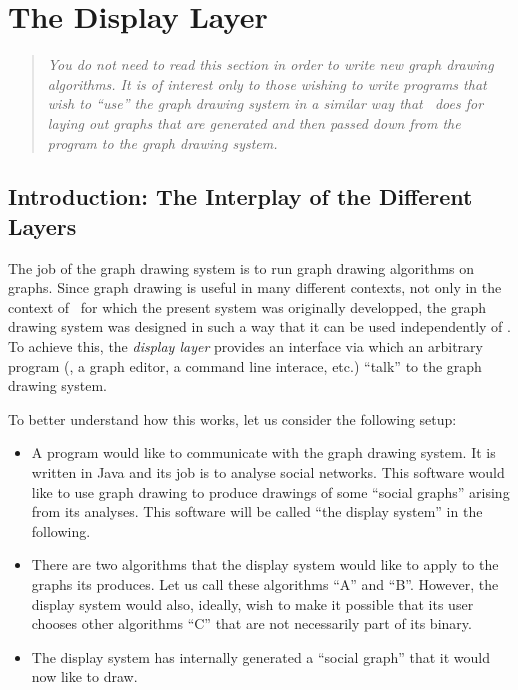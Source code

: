 %
%
%


\section{The Display Layer}

{}


\label{section-gd-display-layer}

\begin{quote}
  \itshape You do not need to read this section in order to write new
  graph drawing algorithms. It is of interest only to those wishing to
  write programs that wish to ``use'' the graph drawing system in a
  similar way that \tikzname\ does for laying out graphs that are
  generated and then passed down from the program to the graph drawing
  system.
\end{quote}


\subsection{Introduction: The Interplay of the Different Layers}

The job of the graph drawing system is to run graph drawing algorithms
on graphs. Since graph drawing is useful in many different contexts,
not only in the context of \tikzname\ for which the present system was
originally developped, the graph drawing system was designed in such a
way that it can be used independently of \tikzname. To achieve this,
the \emph{display layer} provides an interface via which an arbitrary
program (\tikzname, a graph editor, a command line interace, etc.)
``talk'' to the graph drawing system.

To better understand how this works, let us consider the following
setup: 

\begin{itemize}
\item A program would like to communicate with the graph
  drawing system. It is written in Java and its job is to analyse social
  networks. This software would like to use graph drawing to produce
  drawings of some ``social graphs'' arising from its analyses. This
  software will be called ``the display system'' in the following.
\item There are two algorithms that the display system would like to apply to
  the graphs its produces. Let us call these algorithms ``A'' and
  ``B''. However, the display system would also, ideally, wish to make it
  possible that its user chooses other algorithms ``C'' that are not
  necessarily part of its binary.
\item The display system has internally generated a ``social graph'' that it
  would now like to draw.
\end{itemize}

